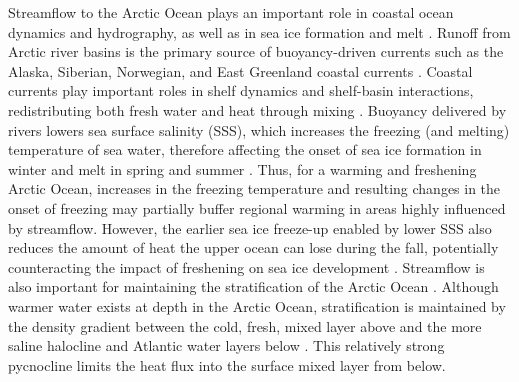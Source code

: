 \documentclass[jgrga, draft]{agutex}
\begin{document}
\begin{article}
Streamflow to the Arctic Ocean plays an important role in coastal ocean dynamics and hydrography, as well as in sea ice formation and melt \citep{Weatherly_1996,Rabe_2011,Fichot_2013}.
Runoff from Arctic river basins is the primary source of buoyancy-driven currents such as the Alaska, Siberian, Norwegian, and East Greenland coastal currents \citep[e.g.][]{Morison_2000,Boyd_2002,Maslowski_2002,McGeehan_2012,Myers_2005}.
Coastal currents play important roles in shelf dynamics and shelf-basin interactions, redistributing both fresh water and heat through mixing \citep[e.g.][]{Carmack_1989,Rudels_1999,Ekwurzel_2001,Maslowski_2014}.
Buoyancy delivered by rivers lowers sea surface salinity (SSS), which increases the freezing (and melting) temperature of sea water, therefore affecting the onset of sea ice formation in winter and melt in spring and summer \citep[e.g.][]{Weatherly_1996}.
Thus, for a warming and freshening Arctic Ocean, increases in the freezing temperature and resulting changes in the onset of freezing may partially buffer regional warming in areas highly influenced by streamflow.
However, the earlier sea ice freeze-up enabled by lower SSS also reduces the amount of heat the upper ocean can lose during the fall, potentially counteracting the impact of freshening on sea ice development \citep{Weatherly_1996,Morison_2012}.
Streamflow is also important for maintaining the stratification of the Arctic Ocean \citep{Nummelin_2015}.
Although warmer water exists at depth in the Arctic Ocean, stratification is maintained by the density gradient between the cold, fresh, mixed layer above and the more saline halocline and Atlantic water layers below \citep{Serreze_2006}.
This relatively strong pycnocline limits the heat flux into the surface mixed layer from  below.


\end{article}
\end{document}

